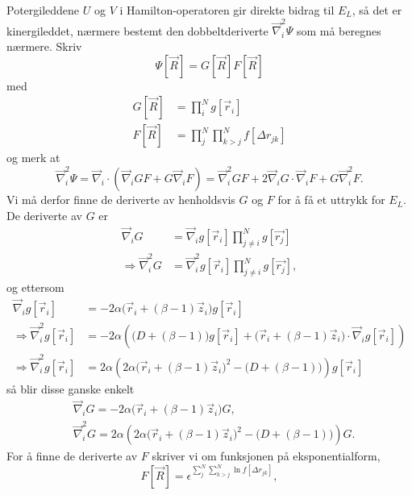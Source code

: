 \documentclass[pdftex,10pt,b5paper,twoside]{book}
\begin{document}
Potergileddene $U$ og $V$ i Hamilton-operatoren gir direkte bidrag til $E_L$, så det er kinergileddet, nærmere bestemt den dobbeltderiverte $\vec{\nabla}_i^2\Psi$ som må beregnes nærmere. Skriv
\begin{equation}
\Psi[\vec{R}] = G[\vec{R}]F[\vec{R}]
\end{equation}
med
\begin{align}
G[\vec{R}] &= \prod\limits_i^N g[\vec{r}_i] \\
F[\vec{R}] &= \prod\limits_j^N\prod\limits_{k > j}^N f[\Delta{r}_{jk}] 
\end{align}
og merk at
\begin{equation}
\vec{\nabla}_i^2\Psi = \vec{\nabla}_i\cdot\left(\vec{\nabla}_i G F + G \vec{\nabla}_i F\right) = \vec{\nabla}_i^2 G F + 2\vec{\nabla}_i G \cdot \vec{\nabla}_i F + G \vec{\nabla}_i^2 F. \label{Lap_Psi_1} 
\end{equation}
Vi må derfor finne de deriverte av henholdsvis $G$ og $F$ for å få et uttrykk for $E_L$. De deriverte av $G$ er 
\begin{align}
\vec{\nabla}_i G &= \vec{\nabla}_i g[\vec{r}_i] \prod\limits_{j \neq i}^N g[\vec{r_j}] \\
\Longrightarrow \vec{\nabla}_i^2 G &= \vec{\nabla}_i^2 g[\vec{r}_i] \prod\limits_{j \neq i}^N g[\vec{r_j}],
\end{align}
og ettersom
\begin{align}
\vec{\nabla}_i g[\vec{r}_i] &= -2\alpha\Big(\vec{r}_i+(\beta-1)\vec{z}_i\Big)g[\vec{r}_i] \\
\Longrightarrow \vec{\nabla}_i^2 g[\vec{r}_i]
&= -2\alpha\left(\Big(D+(\beta-1)\Big)g[\vec{r}_i]+\Big(\vec{r}_i+(\beta-1)\vec{z}_i\Big)\cdot\vec{\nabla}_i g[\vec{r}_i]\right) \nonumber\\
\Longrightarrow \vec{\nabla}_i^2 g[\vec{r}_i]
&= 2\alpha\left(2\alpha\Big(\vec{r}_i+(\beta-1)\vec{z}_i\Big)^2-\Big(D+(\beta-1)\Big)\right)g[\vec{r}_i]
\end{align}
så blir disse ganske enkelt
\begin{align}
&\vec{\nabla}_i G = -2\alpha\Big(\vec{r}_i+(\beta-1)\vec{z}_i\Big)G, \label{grad_G}\\
&\vec{\nabla}_i^2G = 2\alpha\left(2\alpha\Big(\vec{r}_i+(\beta-1)\vec{z}_i\Big)^2-\Big(D+(\beta-1)\Big)\right)G. \label{Lap_G}
\end{align}
For å finne de deriverte av $F$ skriver vi om funksjonen på eksponentialform,
\begin{equation}
F[\vec{R}] = \epsilon^{\sum\limits_{j}^N\sum\limits_{k > j}^N \ln f[\Delta{r}_{jk}]},
\end{equation}
\end{document}
